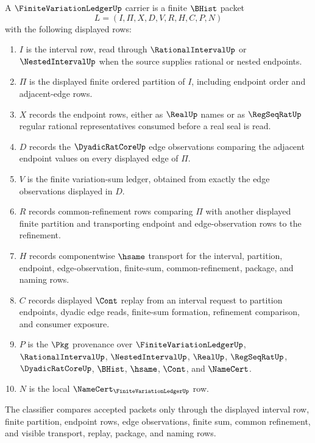 \begin{definition}
\label{def:finite-variation-ledger-carrier}
A $\FiniteVariationLedgerUp$ carrier is a finite $\BHist$ packet
$$
L=(I,\Pi,X,D,V,R,H,C,P,N)
$$
with the following displayed rows:
\begin{enumerate}
\item $I$ is the interval row, read through $\RationalIntervalUp$ or $\NestedIntervalUp$ when the source supplies rational or nested endpoints.
\item $\Pi$ is the displayed finite ordered partition of $I$, including endpoint order and adjacent-edge rows.
\item $X$ records the endpoint rows, either as $\RealUp$ names or as $\RegSeqRatUp$ regular rational representatives consumed before a real seal is read.
\item $D$ records the $\DyadicRatCoreUp$ edge observations comparing the adjacent endpoint values on every displayed edge of $\Pi$.
\item $V$ is the finite variation-sum ledger, obtained from exactly the edge observations displayed in $D$.
\item $R$ records common-refinement rows comparing $\Pi$ with another displayed finite partition and transporting endpoint and edge-observation rows to the refinement.
\item $H$ records componentwise $\hsame$ transport for the interval, partition, endpoint, edge-observation, finite-sum, common-refinement, package, and naming rows.
\item $C$ records displayed $\Cont$ replay from an interval request to partition endpoints, dyadic edge reads, finite-sum formation, refinement comparison, and consumer exposure.
\item $P$ is the $\Pkg$ provenance over $\FiniteVariationLedgerUp$, $\RationalIntervalUp$, $\NestedIntervalUp$, $\RealUp$, $\RegSeqRatUp$, $\DyadicRatCoreUp$, $\BHist$, $\hsame$, $\Cont$, and $\NameCert$.
\item $N$ is the local $\NameCert_{\FiniteVariationLedgerUp}$ row.
\end{enumerate}
The classifier compares accepted packets only through the displayed interval row, finite partition, endpoint rows, edge observations, finite sum, common refinement, and visible transport, replay, package, and naming rows.
\end{definition}

